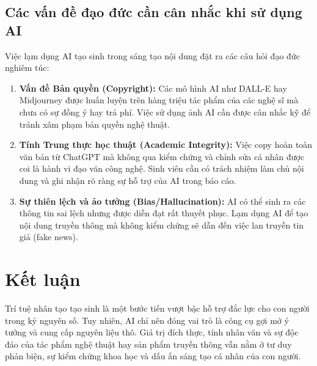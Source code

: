 \documentclass[12pt,a4paper]{article}
\begin{document}
\subsection{Các vấn đề đạo đức cần cân nhắc khi sử dụng AI}
Việc lạm dụng AI tạo sinh trong sáng tạo nội dung đặt ra các câu hỏi đạo đức nghiêm túc:
\begin{enumerate}
    \item \textbf{Vấn đề Bản quyền (Copyright):} Các mô hình AI như DALL-E hay Midjourney được huấn luyện trên hàng triệu tác phẩm của các nghệ sĩ mà chưa có sự đồng ý hay trả phí. Việc sử dụng ảnh AI cần được cân nhắc kỹ để tránh xâm phạm bản quyền nghệ thuật.
    \item \textbf{Tính Trung thực học thuật (Academic Integrity):} Việc copy hoàn toàn văn bản từ ChatGPT mà không qua kiểm chứng và chỉnh sửa cá nhân được coi là hành vi đạo văn công nghệ. Sinh viên cần có trách nhiệm làm chủ nội dung và ghi nhận rõ ràng sự hỗ trợ của AI trong báo cáo.
    \item \textbf{Sự thiên lệch và ảo tưởng (Bias/Hallucination):} AI có thể sinh ra các thông tin sai lệch nhưng được diễn đạt rất thuyết phục. Lạm dụng AI để tạo nội dung truyền thông mà không kiểm chứng sẽ dẫn đến việc lan truyền tin giả (fake news).
\end{enumerate}

\newpage
\section{Kết luận}
Trí tuệ nhân tạo tạo sinh là một bước tiến vượt bậc hỗ trợ đắc lực cho con người trong kỷ nguyên số. Tuy nhiên, AI chỉ nên đóng vai trò là công cụ gợi mở ý tưởng và cung cấp nguyên liệu thô. Giá trị đích thực, tính nhân văn và sự độc đáo của tác phẩm nghệ thuật hay sản phẩm truyền thông vẫn nằm ở tư duy phản biện, sự kiểm chứng khoa học và dấu ấn sáng tạo cá nhân của con người.
\end{document}
